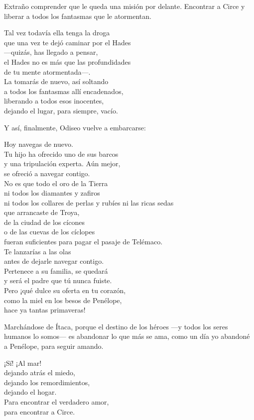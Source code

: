 Extraño comprender que le queda una misión por delante. Encontrar a Circe y liberar a todos los fantasmas que le atormentan.

\begin{versopropio}
Tal vez todavía ella tenga la droga\\
que una vez te dejó caminar por el Hades\\
---quizás, has llegado a pensar,\\
el Hades no es más que las profundidades\\
de tu mente atormentada---.\\
La tomarás de nuevo, así soltando\\
a todos los fantasmas allí encadenados,\\
liberando a todos esos inocentes,\\
dejando el lugar, para siempre, vacío.
\end{versopropio}


Y así, finalmente, Odiseo vuelve a embarcarse:

\begin{versopropio}
Hoy navegas de nuevo.\\
Tu hijo ha ofrecido uno de sus barcos\\
y una tripulación experta. Aún mejor,\\
se ofreció a navegar contigo.\\
No es que todo el oro de la Tierra\\
ni todos los diamantes y zafiros\\
ni todos los collares de perlas y rubíes ni las ricas sedas\\
que arrancaste de Troya,\\
de la ciudad de los cícones\\
o de las cuevas de los cíclopes\\
fueran suficientes para pagar el pasaje de Telémaco.\\
Te lanzarías a las olas\\
antes de dejarle navegar contigo.\\
Pertenece a su familia, se quedará\\
y será el padre que tú nunca fuiste.\\
Pero ¡qué dulce su oferta en tu corazón,\\
como la miel en los besos de Penélope,\\
hace ya tantas primaveras!
\end{versopropio}

Marchándose de Ítaca, porque el destino de los héroes ---y todos los seres humanos lo somos--- es abandonar lo que más se ama, como un día yo abandoné a Penélope, para seguir amando.

\begin{versopropio}
¡Sí! ¡Al mar!\\
dejando atrás el miedo,\\
dejando los remordimientos,\\
dejando el hogar.\\
Para encontrar el verdadero amor,\\
para encontrar a Circe.
\end{versopropio}





%
